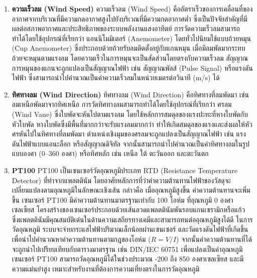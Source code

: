 \begin{enumerate}
\item \textbf{ความเร็วลม (Wind Speed)}
ความเร็วลม (Wind Speed) คืออัตราเร็วของการเคลื่อนที่ของอากาศจากบริเวณที่มีความกดอากาศสูงไปยังบริเวณที่มีความกดอากาศต่ำ ซึ่งเป็นปัจจัยสำคัญที่มีผลต่อสภาพอากาศและประสิทธิภาพของระบบพลังงานแสงอาทิตย์
การวัดความเร็วลมสามารถทำได้โดยใช้อุปกรณ์ที่เรียกว่า แอนนิโมมิเตอร์ (Anemometer) โดยทั่วไปนิยมใช้แบบถ้วยหมุน (Cup Anemometer) ซึ่งประกอบด้วยถ้วยรับลมติดตั้งอยู่กับแกนหมุน เมื่อมีลมพัดมากระทบ ถ้วยจะหมุนตามแรงลม โดยความเร็วในการหมุนจะเป็นสัดส่วนโดยตรงกับความเร็วลม สัญญาณการหมุนของแกนจะถูกแปลงเป็นสัญญาณไฟฟ้า เช่น สัญญาณพัลส์ (Pulse Signal) หรือแรงดันไฟฟ้า ซึ่งสามารถนำไปคำนวณเป็นค่าความเร็วลมในหน่วยเมตรต่อวินาที (m/s) ได้ \cite{renkeer_anemometer}

\item \textbf{ทิศทางลม (Wind Direction)}
ทิศทางลม (Wind Direction) คือทิศทางที่ลมพัดมา เช่น ลมเหนือพัดมาจากทิศเหนือ การวัดทิศทางลมสามารถทำได้โดยใช้อุปกรณ์ที่เรียกว่า ศรลม (Wind Vane) ซึ่งใบพัดจะหันไปตามแรงลม โดยใช้หลักการสมดุลของแรงปะทะที่หางใบพัดกับหัวใบพัด หางใบพัดซึ่งมีพื้นที่มากกว่าจะรับแรงลมมากกว่า ทำให้เกิดสมดุลของแรงและส่งผลให้หัวศรหันไปในทิศทางที่ลมพัดมา ตำแหน่งเชิงมุมของศรลมจะถูกแปลงเป็นสัญญาณไฟฟ้า เช่น แรงดันไฟฟ้าแบบแอนะล็อก หรือสัญญาณดิจิทัล จากนั้นสามารถนำไปคำนวณเป็นค่าทิศทางลมในรูปแบบองศา (0–360 องศา) หรือทิศหลัก เช่น เหนือ ใต้ ตะวันออก และตะวันตก \cite{meteoblue_wind}

\item \textbf{PT100}
PT100 เป็นเซนเซอร์วัดอุณหภูมิประเภท RTD (Resistance Temperature Detector) ที่ทำจากแพลตตินัม โดยอาศัยหลักการที่ว่าค่าความต้านทานไฟฟ้าของวัสดุจะเปลี่ยนแปลงตามอุณหภูมิในลักษณะเชิงเส้น กล่าวคือ เมื่ออุณหภูมิสูงขึ้น ค่าความต้านทานจะเพิ่มขึ้น
เซนเซอร์ PT100 มีค่าความต้านทานมาตรฐานเท่ากับ 100 โอห์ม ที่อุณหภูมิ 0 องศาเซลเซียส โครงสร้างของเซนเซอร์ประกอบด้วยเส้นลวดแพลตตินัมพันรอบแกนเซรามิกหรือแก้ว ซึ่งแพลตตินัมมีคุณสมบัติเด่นในด้านความเสถียรทางเคมีและสามารถทนต่ออุณหภูมิสูงได้ดี
ในการวัดอุณหภูมิ ระบบจะจ่ายกระแสไฟฟ้าปริมาณเล็กน้อยผ่านเซนเซอร์ และวัดแรงดันไฟฟ้าที่เกิดขึ้นเพื่อนำไปคำนวณหาค่าความต้านทานตามกฎของโอห์ม ($R = V/I$) จากนั้นค่าความต้านทานที่ได้จะถูกนำไปเปรียบเทียบกับตารางมาตรฐาน เช่น DIN/IEC 60751 เพื่อแปลงเป็นค่าอุณหภูมิ เซนเซอร์ PT100 สามารถวัดอุณหภูมิได้ในช่วงประมาณ -200 ถึง 850 องศาเซลเซียส และมีความแม่นยำสูง เหมาะสำหรับงานที่ต้องการความเที่ยงตรงในการวัดอุณหภูมิ \cite{bastor_pt100}
\end{enumerate}

